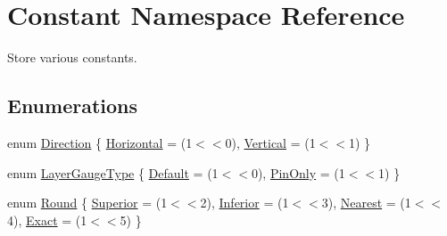 \hypertarget{namespaceConstant}{}\section{Constant Namespace Reference}
\label{namespaceConstant}


Store various constants.  


\subsection*{Enumerations}
\begin{DoxyCompactItemize}
\item 
enum \mbox{\hyperlink{namespaceConstant_ac081a99f2b64361919ed5d9f37c0f9af}{Direction}} \{ \newline
\mbox{\hyperlink{namespaceConstant_ac081a99f2b64361919ed5d9f37c0f9afa7a545ff2d744fe30bfac294dfe9d03db}{Horizontal}} = (1$<$$<$0), 
\newline
\mbox{\hyperlink{namespaceConstant_ac081a99f2b64361919ed5d9f37c0f9afa63ce9cc57c99cccca96aa1157113da34}{Vertical}} = (1$<$$<$1)
 \}
\item 
enum \mbox{\hyperlink{namespaceConstant_ab2e46a17cc373a268c5c24fa0e2067e5}{Layer\+Gauge\+Type}} \{ \newline
\mbox{\hyperlink{namespaceConstant_ab2e46a17cc373a268c5c24fa0e2067e5ac83c789478a5dfedee2496415c62c1fb}{Default}} = (1$<$$<$0), 
\newline
\mbox{\hyperlink{namespaceConstant_ab2e46a17cc373a268c5c24fa0e2067e5a816e7f6e3fb44de0c2da893f32a6748e}{Pin\+Only}} = (1$<$$<$1)
 \}
\item 
enum \mbox{\hyperlink{namespaceConstant_abb6258ce09861f20cfe37b49d9a3515f}{Round}} \{ \newline
\mbox{\hyperlink{namespaceConstant_abb6258ce09861f20cfe37b49d9a3515faaf5371ebaadbfde8cd93c7e56aecb3c2}{Superior}} = (1$<$$<$2), 
\newline
\mbox{\hyperlink{namespaceConstant_abb6258ce09861f20cfe37b49d9a3515fa1140f16a605cb6cc263e206dcc2c90c9}{Inferior}} = (1$<$$<$3), 
\newline
\mbox{\hyperlink{namespaceConstant_abb6258ce09861f20cfe37b49d9a3515fac3c18902fbd4fbc14431d14904b35d61}{Nearest}} = (1$<$$<$4), 
\newline
\mbox{\hyperlink{namespaceConstant_abb6258ce09861f20cfe37b49d9a3515fa8c19f155f88d2db98534c1aec454862d}{Exact}} = (1$<$$<$5)
 \}
\end{DoxyCompactItemize}


